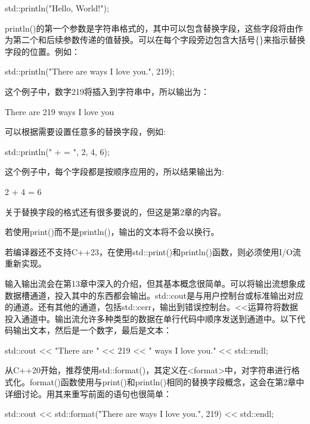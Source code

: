 \begin{cpp}
std::println("Hello, World!");
\end{cpp}

println()的第一个参数是字符串格式的，其中可以包含替换字段，这些字段将由作为第二个和后续参数传递的值替换。可以在每个字段旁边包含大括号\{\}来指示替换字段的位置。例如：

\begin{cpp}
std::println("There are {} ways I love you.", 219);
\end{cpp}

这个例子中，数字219将插入到字符串中，所以输出为：

\begin{shell}
There are 219 ways I love you
\end{shell}

可以根据需要设置任意多的替换字段，例如:

\begin{cpp}
std::println("{} + {} = {}", 2, 4, 6);
\end{cpp}

这个例子中，每个字段都是按顺序应用的，所以结果输出为:

\begin{shell}
2 + 4 = 6
\end{shell}

关于替换字段的格式还有很多要说的，但这是第2章的内容。

若使用print()而不是println()，输出的文本将不会以换行。


若编译器还不支持C++23，在使用std::print()和println()函数，则必须使用I/O流重新实现。

输入输出流会在第13章中深入的介绍，但其基本概念很简单。可以将输出流想象成数据槽通道，投入其中的东西都会输出。std::cout是与用户控制台或标准输出对应的通道。还有其他的通道，包括std::cerr，输出到错误控制台。<{}<运算符将数据投入通道中。输出流允许多种类型的数据在单行代码中顺序发送到通道中。以下代码输出文本，然后是一个数字，最后是文本：

\begin{cpp}
std::cout << "There are " << 219 << " ways I love you." << std::endl;
\end{cpp}

从C++20开始，推荐使用std::format()，其定义在<format>中，对字符串进行格式化。format()函数使用与print()和println()相同的替换字段概念，这会在第2章中详细讨论。用其来重写前面的语句也很简单：

\begin{cpp}
std::cout << std::format("There are {} ways I love you.", 219) << std::endl;
\end{cpp}


